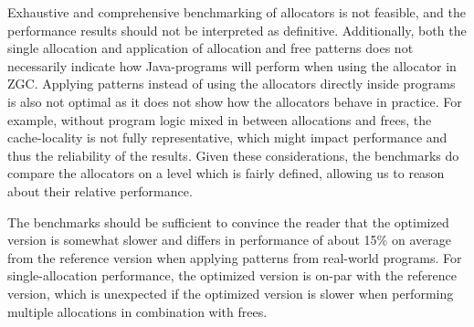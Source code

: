 






Exhaustive and comprehensive benchmarking of allocators is not feasible, and the performance results should not be interpreted as definitive. Additionally, both the single allocation and application of allocation and free patterns does not necessarily indicate how Java-programs will perform when using the allocator in ZGC. Applying patterns instead of using the allocators directly inside programs is also not optimal as it does not show how the allocators behave in practice. For example, without program logic mixed in between allocations and frees, the cache-locality is not fully representative, which might impact performance and thus the reliability of the results. Given these considerations, the benchmarks do compare the allocators on a level which is fairly defined, allowing us to reason about their relative performance. 

The benchmarks should be sufficient to convince the reader that the optimized version is somewhat slower and differs in performance of about 15\% on average from the reference version when applying patterns from real-world programs. For single-allocation performance, the optimized version is on-par with the reference version, which is unexpected if the optimized version is slower when performing multiple allocations in combination with frees. 

